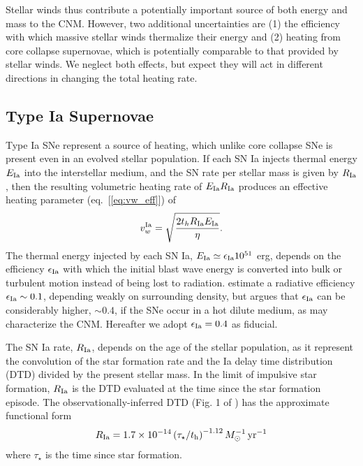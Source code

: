 \documentclass[usenatbib,fleqn]{mn2e}
\newcommand{\RateIa}{R_{\rm Ia}}
\begin{document}
Stellar winds thus contribute a potentially important source of both
energy and mass to the CNM.  However, two additional uncertainties are
(1) the efficiency with which massive stellar winds thermalize their
energy and (2) heating from core collapse supernovae, which is
potentially comparable to that provided by stellar winds.  We neglect
both effects, but expect they will act in different directions in
changing the total heating rate.

\subsection{Type Ia Supernovae} 

Type Ia SNe represent a source of heating, which unlike core collapse
SNe is present even in an evolved stellar population.  If each SN Ia
injects thermal energy $E_{\rm Ia}$ into the interstellar medium, and
the SN rate per stellar mass is given by $R_{\rm Ia}$, then the
resulting volumetric heating rate of $E_{\rm Ia}R_{\rm Ia}$ produces
an effective heating parameter (eq.~[\ref{eq:vw_eff}])
of \begin{align} v_{w}^{\rm Ia} =\sqrt{\frac{2 t_h R_{\rm Ia} E_{\rm
        Ia}}{\eta}} \label{eq:vw_sne}.
\end{align} The thermal energy injected by each SN Ia, $E_{\rm Ia} \simeq
\epsilon_{\rm Ia} 10^{51}$ erg, depends on the efficiency $\epsilon_{\rm Ia}$
with which the initial blast wave energy is converted into bulk or turbulent
motion instead of being lost to radiation.  \cite{Thornton+98}
estimate a radiative efficiency $\epsilon_{\rm Ia} \sim 0.1$,
depending weakly on surrounding density, but \citet{Sharma+14} argues
that $\epsilon_{\rm Ia}$ can be considerably higher, $\sim 0.4$, if
the SNe occur in a hot dilute medium, as may characterize the CNM.  Hereafter we adopt $\epsilon_{\rm Ia} = 0.4$ as fiducial.

The SN Ia rate, $\RateIa$, depends on the age of the stellar
population, as it represent the convolution of the star formation rate
and the Ia delay time distribution (DTD) divided by the present
stellar mass.  In the limit of impulsive star formation, $\RateIa$ is
the DTD evaluated at the time since the star formation episode.  The
observationally-inferred DTD (Fig. 1 of \citealt{MaozMannucci+:2012a})
has the approximate functional form \begin{align} R_{\rm Ia}
  =1.7\times 10^{-14}\left(\tau_{\star}/t_{\rm h}\right)^{-1.12}
  M_{\odot}^{-1}\,{\rm yr^{-1}}
\label{eq:DTD}
  \end{align}
  where $\tau_{\star}$ is the time since star formation.
\end{document}
